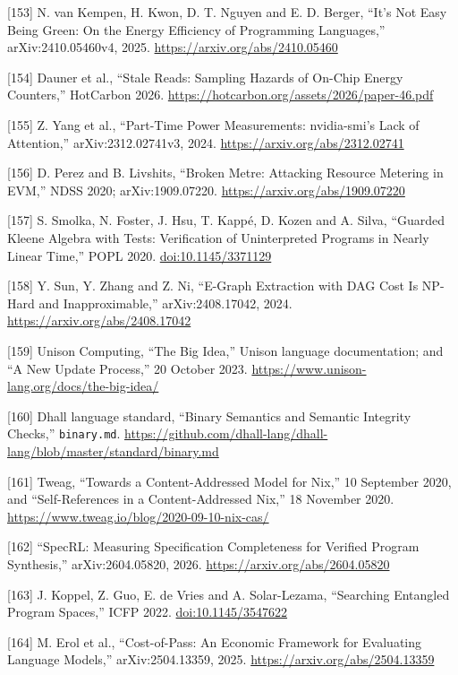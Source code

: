 \documentclass[10pt,letterpaper]{article}
\begin{document}
{[}153{]} N. van Kempen, H. Kwon, D. T. Nguyen and E. D. Berger, ``It's
Not Easy Being Green: On the Energy Efficiency of Programming
Languages,'' arXiv:2410.05460v4, 2025.
\url{https://arxiv.org/abs/2410.05460}

{[}154{]} Dauner et al., ``Stale Reads: Sampling Hazards of On-Chip
Energy Counters,'' HotCarbon 2026.
\url{https://hotcarbon.org/assets/2026/paper-46.pdf}

{[}155{]} Z. Yang et al., ``Part-Time Power Measurements: nvidia-smi's
Lack of Attention,'' arXiv:2312.02741v3, 2024.
\url{https://arxiv.org/abs/2312.02741}

{[}156{]} D. Perez and B. Livshits, ``Broken Metre: Attacking Resource
Metering in EVM,'' NDSS 2020; arXiv:1909.07220.
\url{https://arxiv.org/abs/1909.07220}

{[}157{]} S. Smolka, N. Foster, J. Hsu, T. Kappé, D. Kozen and A. Silva,
``Guarded Kleene Algebra with Tests: Verification of Uninterpreted
Programs in Nearly Linear Time,'' POPL 2020.
\href{https://doi.org/10.1145/3371129}{doi:10.1145/3371129}

{[}158{]} Y. Sun, Y. Zhang and Z. Ni, ``E-Graph Extraction with DAG Cost
Is NP-Hard and Inapproximable,'' arXiv:2408.17042, 2024.
\url{https://arxiv.org/abs/2408.17042}

{[}159{]} Unison Computing, ``The Big Idea,'' Unison language
documentation; and ``A New Update Process,'' 20 October 2023.
\url{https://www.unison-lang.org/docs/the-big-idea/}

{[}160{]} Dhall language standard, ``Binary Semantics and Semantic
Integrity Checks,'' \texttt{binary.md}.
\url{https://github.com/dhall-lang/dhall-lang/blob/master/standard/binary.md}

{[}161{]} Tweag, ``Towards a Content-Addressed Model for Nix,'' 10
September 2020, and ``Self-References in a Content-Addressed Nix,'' 18
November 2020. \url{https://www.tweag.io/blog/2020-09-10-nix-cas/}

{[}162{]} ``SpecRL: Measuring Specification Completeness for Verified
Program Synthesis,'' arXiv:2604.05820, 2026.
\url{https://arxiv.org/abs/2604.05820}

{[}163{]} J. Koppel, Z. Guo, E. de Vries and A. Solar-Lezama,
``Searching Entangled Program Spaces,'' ICFP 2022.
\href{https://doi.org/10.1145/3547622}{doi:10.1145/3547622}

{[}164{]} M. Erol et al., ``Cost-of-Pass: An Economic Framework for
Evaluating Language Models,'' arXiv:2504.13359, 2025.
\url{https://arxiv.org/abs/2504.13359}
\end{document}
